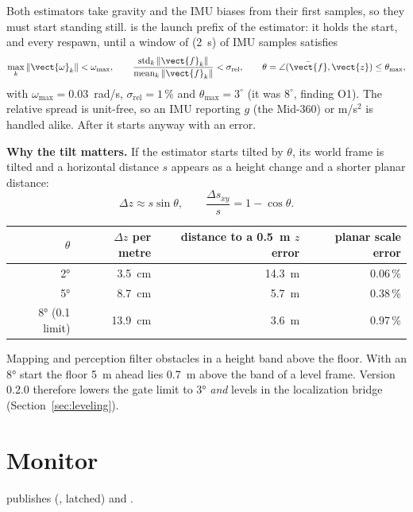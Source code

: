 Both estimators take gravity and the IMU biases from their first samples, so they must start
standing still.  is the launch prefix of the estimator: it holds the start, and
every respawn, until a window of  (2~s) of IMU samples satisfies
\begin{equation}
  \max_k \|\vect{\omega}_k\| < \omega_{\max}, \qquad
  \frac{\operatorname{std}_k \|\vect{f}_k\|}{\operatorname{mean}_k \|\vect{f}_k\|} <
  \sigma_{\mathrm{rel}}, \qquad
  \theta = \angle(\bar{\vect{f}}, \vect{z}) \le \theta_{\max},
\end{equation}
with $\omega_{\max} = 0.03$~rad/s, $\sigma_{\mathrm{rel}} = 1\,\%$ and $\theta_{\max} = 3^\circ$
(it was $8^\circ$, finding O1). The relative spread is unit-free, so an IMU reporting $g$ (the
Mid-360) or m/s$^2$ is handled alike. After  it starts anyway with an error.

\textbf{Why the tilt matters.} If the estimator starts tilted by $\theta$, its world frame is
tilted and a horizontal distance $s$ appears as a height change and a shorter planar distance:
\begin{equation}
  \Delta z \approx s\sin\theta, \qquad \frac{\Delta s_{xy}}{s} = 1 - \cos\theta .
\end{equation}
\begin{center}
\begin{tabular}{@{}rrrr@{}}
  \toprule
  $\theta$ & $\Delta z$ per metre & distance to a 0.5~m $z$ error & planar scale error \\
  \midrule
  2° & 3.5~cm & 14.3~m & 0.06\,\% \\
  5° & 8.7~cm & 5.7~m & 0.38\,\% \\
  8° (0.1 limit) & 13.9~cm & 3.6~m & 0.97\,\% \\
  \bottomrule
\end{tabular}
\end{center}
Mapping and perception filter obstacles in a height band above the floor. With an 8° start the
floor 5~m ahead lies 0.7~m above the band of a level frame. Version 0.2.0 therefore lowers the
gate limit to 3° \emph{and} levels  in the localization bridge
(Section~\ref{sec:leveling}).

\section{Monitor}

 publishes  (, latched)
and .

